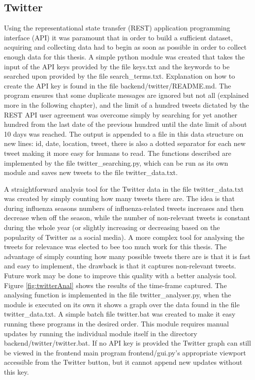 \subsection{Twitter}
Using the representational state transfer (REST) application programming interface (API) it was paramount that in order to build a sufficient dataset, acquiring and collecting data had to begin as soon as possible in order to collect enough data for this thesis. A simple python module was created that takes the input of the API keys provided by the file keys.txt and the keywords to be searched upon provided by the file search\_terms.txt. Explanation on how to create the API key is found in the file backend/twitter/README.md. The program ensures that some duplicate messages are ignored but not all (explained more in the following chapter), and the limit of a hundred tweets dictated by the REST API user agreement was overcome simply by searching for yet another hundred from the last date of the previous hundred until the date limit of about 10 days was reached.
The output is appended to a file in this data structure on new lines: id, date, location, tweet, there is also a dotted separator for each new tweet making it more easy for humans to read. The functions described are implemented by the file twitter\_searching.py, which can be run as its own module and saves new tweets to the file twitter\_data.txt.

A straightforward analysis tool for the Twitter data in the file twitter\_data.txt was created by simply counting how many tweets there are. The idea is that during influenza seasons numbers of influenza-related tweets increases and then decrease when off the season, while the number of non-relevant tweets is constant during the whole year (or slightly increasing or decreasing based on the popularity of Twitter as a social media). A more complex tool for analysing the tweets for relevance was elected to bee too much work for this thesis. The advantage of simply counting how many possible tweets there are is that it is fast and easy to implement, the drawback is that it captures non-relevant tweets. Future work may be done to improve this quality with a better analysis tool. Figure \ref{fig:twitterAnal} shows the results of the time-frame captured. The analysing function is implemented in the file twitter\_analyser.py, when the module is executed on its own it shows a graph over the data found in the file twitter\_data.txt. A simple batch file twitter.bat was created to make it easy running these programs in the desired order. This module requires manual updates by running the individual module itself in the directory backend/twitter/twitter.bat. If no API key is provided the Twitter graph can still be viewed in the frontend main program frontend/gui.py's appropriate viewport accessible from the Twitter button, but it cannot append new updates without this key.

